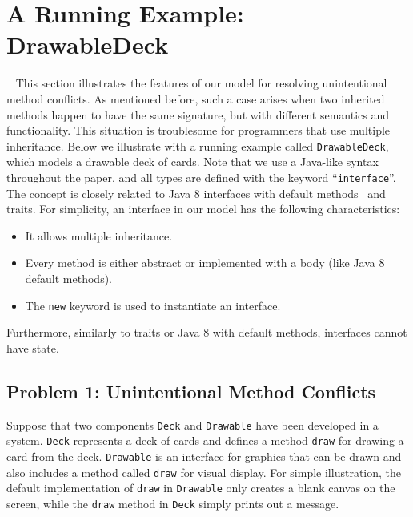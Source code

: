 \section{A Running Example: DrawableDeck}~\label{sec:overview}
This section illustrates the features of our model for
resolving unintentional method conflicts. As mentioned before, such a
case arises when two inherited methods happen to have the same
signature, but with different semantics and functionality. This
situation is troublesome for programmers that use multiple
inheritance. Below we illustrate with a running example called
\lstinline|DrawableDeck|, which models a drawable deck of cards. 
Note that we use a Java-like syntax
throughout the paper, and all types are defined with the keyword
``\lstinline|interface|''. The concept is closely related to Java 8
interfaces with default methods~\cite{bono14} and traits. For simplicity, an interface in our model has
the following characteristics:
\begin{itemize}
  \item It allows multiple inheritance.
  \item Every method is either abstract or implemented with a body (like Java 8 default methods). 
  \item The \lstinline|new| keyword is used to instantiate an interface.
\end{itemize}
Furthermore, similarly to traits or Java 8 with default methods,
interfaces cannot have state.



\subsection{Problem 1: Unintentional Method Conflicts}
Suppose that two components \lstinline|Deck| and \lstinline|Drawable| 
have been developed in a system. \lstinline|Deck| represents a deck
of cards and defines a method \lstinline|draw| for drawing a card from the
deck.  \lstinline|Drawable| is an interface for graphics that
can be drawn and also includes a method called \lstinline|draw| for
visual display. For simple illustration, the default implementation of
\lstinline|draw| in \lstinline|Drawable| only creates a blank canvas
on the screen, while the \lstinline|draw| method in \lstinline|Deck| simply
prints out a message.

